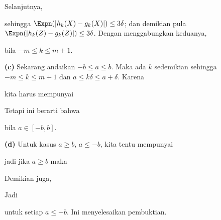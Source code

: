 {\noindent Selanjutnya,




\noindent sehingga $\Expn(|h_k(X)-g_k(X)|)\le 3\delta$; dan demikian pula
$\Expn(|h_k(Z)-g_k(Z)|)\le 3\delta$. Dengan menggabungkan keduanya,


\noindent bila $-m\le k\le m+1$.

\medskip

{\bf (c)} Sekarang andaikan $-b\le a\le b$. Maka ada $k$ sedemikian sehingga
$-m\le k\le m+1$ dan $a\le k\delta\le a+\delta$. Karena


\noindent kita harus mempunyai



\noindent Tetapi ini berarti bahwa


\noindent bila $a\in[-b,b]$.

\medskip

{\bf (d)} Untuk kasus $a\ge b$, $a\le -b$, kita tentu mempunyai


\noindent jadi jika $a\ge b$ maka


\noindent Demikian juga,


\noindent Jadi


\noindent untuk setiap $a\le -b$. Ini menyelesaikan pembuktian.
}%

